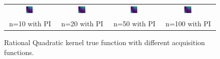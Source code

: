 \documentclass[11pt]{article}
\begin{document}
\begin{figure}[H]
\begin{tabular}{cccc}
        \includegraphics[width=0.225\textwidth]{../Task-02/plots/true_function_rational_quadratic_n10_PI.png} &
        \includegraphics[width=0.225\textwidth]{../Task-02/plots/true_function_rational_quadratic_n20_PI.png} &
        \includegraphics[width=0.225\textwidth]{../Task-02/plots/true_function_rational_quadratic_n50_PI.png} &
        \includegraphics[width=0.225\textwidth]{../Task-02/plots/true_function_rational_quadratic_n100_PI.png} \\
        n=10 with PI & n=20 with PI & n=50 with PI & n=100 with PI \\
    \end{tabular}
    \caption{Rational Quadratic kernel true function with different acquisition functions.}
    \label{fig:rational_quadratic_true_function}
\end{figure}
\end{document}
